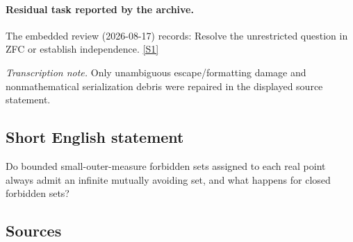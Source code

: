 \documentclass[11pt,a4paper]{article}
\newcommand{\sref}[2]{\hyperlink{source:#1:#2}{[S#2]}}
\begin{document}
\paragraph{Residual task reported by the archive.}

The embedded review (2026-08-17) records: Resolve the unrestricted question in ZFC or establish independence. \sref{2146}{1}

{\small\emph{Transcription note.} Only unambiguous escape/formatting damage and nonmathematical serialization debris were repaired in the displayed source statement.}

\subsection{Short English statement}

Do bounded small-outer-measure forbidden sets assigned to each real point always admit an infinite mutually avoiding set, and what happens for closed forbidden sets?

\subsection{Sources}
\end{document}
